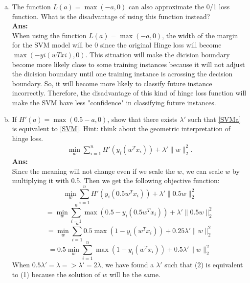 \documentclass[11pt]{article}
\begin{document}
\begin{enumerate}[(a)]
\item The function $L(a) = \max(-a,0)$ can also approximate the 0/1 loss function. What is the disadvantage of using this function instead?\\
\textbf{Ans:}\\
When using the function $L(a) = \max(-a,0)$, the width of the margin for the SVM model will be 0 since the original Hinge loss will become $\max(-yi(wT xi),0)$. This situation will make the dicision boundary become more likely close to some training instances because it will not adjust the dicision boundary until one training instance is acrossing the decision boundary. So, it will become more likely to classify future instance incorrectly. Therefore, the disadvantage of this kind of hinge loss function will make the SVM have less "confidence" in classifying future instances. \\


\item If $H'(a) = \max(0.5-a,0)$, show that there exists $\lambda'$ such that \eqref{SVMa} is equivalent to \eqref{SVM}.  Hint: think about the geometric interpretation of hinge loss.
\begin{align}\label{SVMa}
\min_{w}\sum_{i=1}^n H'(y_i(w^Tx_i)) + \lambda'\|w\|_2^2.
\end{align}
\textbf{Ans:}\\
Since the meaning will not change even if we scale the $w$, we can scale $w$ by multiplying it with 0.5. Then we get the following objective function:
$$\min_{w}\sum_{i=1}^n H'(y_i(0.5w^Tx_i)) + \lambda'\|0.5w\|_2^2$$
$$=\min_{w}\sum_{i=1}^n \max(0.5-y_i(0.5w^Tx_i)) + \lambda'\|0.5w\|_2^2$$
$$=\min_{w}\sum_{i=1}^n 0.5\max(1-y_i(w^Tx_i)) + 0.25\lambda'\|w\|_2^2$$
$$=0.5\min_{w}\sum_{i=1}^n \max(1-y_i(w^Tx_i)) + 0.5\lambda'\|w\|_2^2$$
When $0.5\lambda'=\lambda => \lambda' = 2\lambda$, we have found a $\lambda'$ such that (2) is equivalent to (1) because the solution of $w$ will be the same.

\end{enumerate}

\end{document}
